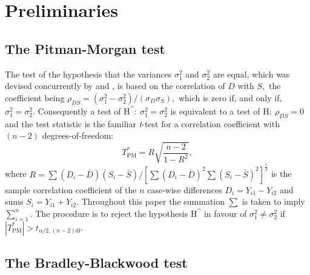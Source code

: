 \documentclass[12pt, a4paper]{report}
\theoremstyle{plain}
\theoremstyle{definition}
\theoremstyle{remark}
\begin{document}
\newpage


\section{Preliminaries}

\subsection{The Pitman-Morgan test}

The test of the hypothesis that the variances $\sigma^2_1$ and $\sigma^2_2$ are equal, which was devised concurrently by \cite{Pit39} and \cite{Morgan39}, is based on the correlation of $D$ with $S,$ the coefficient being $\rho_{DS} = (\sigma^2_1 - \sigma^2_2) / (\sigma_D \sigma_S ),$ which is zero if, and only if, $\sigma^2_1 = \sigma^2_2.$ Consequently a test of $\textrm{H}^{\prime\prime}\colon\ \sigma^2_1 = \sigma^2_2$ is equivalent to a test of $\textrm{H}\colon\ \rho_{DS}=0$ and the test statistic is the familiar {\it t}-test for a correlation coefficient with $(n-2)$ degrees-of-freedom:  
\[
T^*_\mathrm{PM} = R \sqrt{ \frac{n-2}{1-R^2} },
\]
where $R =  \sum (D_i-\bar{D})(S_i-\bar{S}) / [ \sum(D_i-\bar{D})^2 \sum (S_i-\bar{S})^2 ]^{\frac{1}{2}} $ 
is the sample correlation coefficient of the $n$ case-wise differences $D_i = Y_{i1} - Y_{i2}$ and sums $S_i = Y_{i1} + Y_{i2}.$ Throughout this paper the summation $\sum$ is taken to imply $\sum_{i=1}^n.$  The procedure is to reject the hypothesis $\textrm{H}^{\prime\prime}$ in favour of $\sigma^2_1\neq\sigma^2_2$ if $|T^*_\mathrm{PM}| >  t_{\alpha/2,(n-2)\textrm{df}}.$ 

\subsection{The Bradley-Blackwood test}
\end{document}

